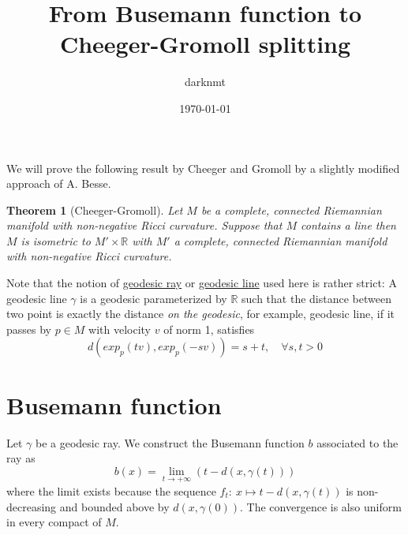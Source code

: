 \documentclass[11pt]{article}
\author{darknmt}
\date{\today}
\title{From Busemann function to Cheeger-Gromoll splitting}
\newtheorem{theorem}{Theorem}
\begin{document}
\maketitle
\tableofcontents

\iffalse
\begin{info}
The PDF version of this page can be downloaded by replacing \texttt{html} in the its address by
\texttt{pdf}. 
For example \texttt{/html/sheaf-cohomology.html} should become \texttt{/pdf/sheaf-cohomology.pdf}.
\end{info}
\fi

\iffalse
\begin{info}
This post is a part of the \href{../res/Stage2017.pdf}{memoire of my M1 internship} at I2M. The memoire contains,
needless to say, less errors than this page.
\end{info}
\fi


We will prove the following result by Cheeger and Gromoll by a slightly modified approach of
A. Besse.


\begin{theorem}[Cheeger-Gromoll]
\label{org547c731}
\label{thm:cheeger-gromoll}
Let \(M\) be a complete, connected Riemannian manifold with non-negative Ricci curvature. Suppose
that \(M\) contains a line then \(M\) is isometric to \(M'\times \mathbb{R}\) with \(M'\) a complete,
connected Riemannian manifold with non-negative Ricci curvature.
\end{theorem}

Note that the notion of \uline{geodesic ray} or \uline{geodesic line} used here is rather strict: A geodesic
line \(\gamma\) is a geodesic parameterized by \(\mathbb{R}\) such that the distance between two point is
exactly the distance \emph{on the geodesic}, for example, geodesic line, if it passes by \(p\in M\) with
velocity \(v\) of norm 1, satisfies
\[
d(exp_p(tv), exp_p(-sv)) = s+t,\quad \forall s,t>0
\]


\section{Busemann function}
\label{sec:org3365e84}

Let \(\gamma\) be a geodesic ray. We construct the Busemann function \(b\) associated to the ray as
\[
b(x) = \lim_{t\to+\infty}\left( t - d(x,\gamma(t))\right)
\]
where the limit exists because the sequence \(f_t:\ x\mapsto t - d(x,\gamma(t))\) is non-decreasing and bounded above by
\(d(x,\gamma(0))\). The convergence is also uniform in every compact of \(M\). 
\end{document}
